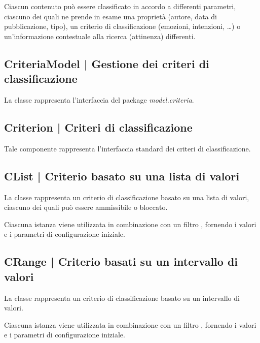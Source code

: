 \documentclass[10pt,a4paper,headinclude,footinclude,hidelinks]{scrreprt} %
\begin{document}
	Ciascun contenuto può essere classificato in accordo a differenti parametri, ciascuno dei quali ne prende in esame una proprietà (autore, data di pubblicazione, tipo), un criterio di classificazione (emozioni, intenzioni, \ldots) o un'informazione contestuale alla ricerca (attinenza) differenti.

	\subsection[CriteriaModel]{CriteriaModel | Gestione dei criteri di classificazione}
	\label{sec:stage:design:model.criteria:criteria-model}
	La classe \textit{} rappresenta l'interfaccia del package \textit{model.criteria}.

	\subsection[Criterion]{Criterion | Criteri di classificazione}
	\label{sec:stage:design:model.criteria:criteria}
	Tale componente rappresenta l'interfaccia standard dei criteri di classificazione.

	\subsection[CList]{CList | Criterio basato su una lista di valori}
	\label{sec:stage:design:model.criteria:list-criterion}
	La classe \textit{} rappresenta un criterio di classificazione basato su una lista di valori, ciascuno dei quali può essere ammissibile o bloccato. 

	Ciascuna istanza viene utilizzata in combinazione con un filtro \textit{}, fornendo i valori e i parametri di configurazione iniziale.

	\subsection[CRange]{CRange | Criterio basati su un intervallo di valori}
	\label{sec:stage:design:model.criteria:range-criterion}
	La classe \textit{} rappresenta un criterio di classificazione basato su un intervallo di valori.

	Ciascuna istanza viene utilizzata in combinazione con un filtro \textit{}, fornendo i valori e i parametri di configurazione iniziale.
\end{document}
